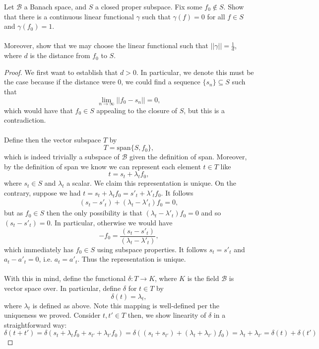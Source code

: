 \documentclass[12pt]{article}
\newenvironment{ex}[2][Exercise]{\begin{trivlist}
\item[\hskip \labelsep {\bfseries #1}\hskip \labelsep {\bfseries #2.}]}{\end{trivlist}}
\begin{document}
\begin{ex}{19}
    Let $\mathcal{B}$ a Banach space, and $S$ a closed proper subspace. Fix some $f_0 \notin S$. Show that there is a continuous linear functional $\gamma$ such that $\gamma(f) = 0$ for all $f \in S$ and $\gamma(f_0) = 1$. \\ \\ Moreover, show that we may choose the linear functional such that $||\gamma|| = \frac{1}{d}$, where $d$ is the distance from $f_0$ to $S$.
    \begin{proof}
        We first want to establish that $d > 0$. In particular, we denote this must be the case because if the distance were $0$, we could find a sequence $\{s_n\} \subseteq S$ such that $$\underset{n \rightarrow \infty}{\lim} ||f_0 - s_n|| = 0,$$ 
        which would have that $f_0 \in S$ appealing to the closure of $S$, but this is a contradiction. \\ \\
        Define then the vector subspace $T$ by 
        $$T = \text{span}\{S, f_0\},$$
        which is indeed trivially a subspace of $\mathcal{B}$ given the definition of span. Moreover, by the definition of span we know we can represent each element $t \in T$ like 
        $$t = s_t + \lambda_tf_0,$$
        where $s_t \in S$ and $\lambda_t$ a scalar. We claim this representation is unique. On the contrary, suppose we had $t = s_t + \lambda_tf_0 = s'_t + \lambda'_tf_0$. It follows 
        \begin{align*}
            (s_t - s'_t) + (\lambda_t - \lambda'_t)f_0 = 0,
        \end{align*}
        but as $f_0 \in S$ then the only possibility is that $(\lambda_t - \lambda'_t)f_0 = 0$ and so $(s_t - s'_t) = 0$. In particular, otherwise we would have 
        $$-f_0 = \frac{(s_t - s'_t)}{(\lambda_t - \lambda'_t)},$$
        which immediately has $f_0 \in S$ using subspace properties. It follows $s_t = s'_t$ and $a_t - a'_t = 0$, i.e. $a_t = a'_t$. Thus the representation is unique. \\ \\
        With this in mind, define the functional $\delta : T \rightarrow K$, where $K$ is the field $\mathcal{B}$ is vector space over. In particular, define $\delta$ for $t \in T$ by
        $$\delta(t) = \lambda_t,$$
        where $\lambda_t$ is defined as above. Note this mapping is well-defined per the uniqueness we proved. Consider $t, t' \in T$ then, we show linearity of $\delta$ in a straightforward way:
        $$\delta(t + t') = \delta(s_t + \lambda_tf_0 + s_{t'} + \lambda_{t'}f_0) = \delta((s_t + s_{t'}) + (\lambda_t + \lambda_{t'})f_0) = \lambda_t + \lambda_{t'} = \delta(t) + \delta(t')$$

\end{proof}
\end{ex}
\end{document}

